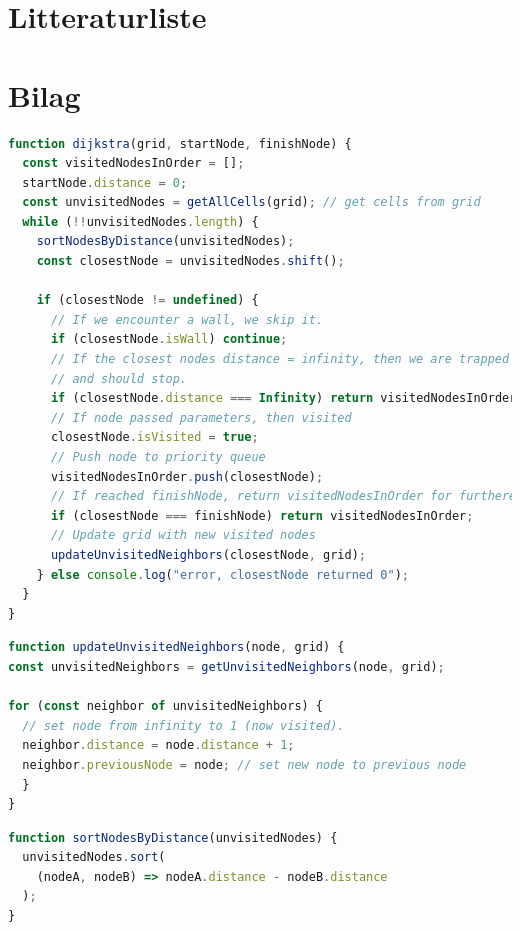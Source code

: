 \documentclass[12pt]{article}
\begin{document}
\section{Litteraturliste}

\newpage
\section{Bilag}

\begin{lstlisting}[language=JavaScript, caption=Kode for Dijkstra's Algoritme, label={lst:Dijkstra}]
function dijkstra(grid, startNode, finishNode) {
  const visitedNodesInOrder = [];
  startNode.distance = 0;
  const unvisitedNodes = getAllCells(grid); // get cells from grid
  while (!!unvisitedNodes.length) {
    sortNodesByDistance(unvisitedNodes);
    const closestNode = unvisitedNodes.shift();

    if (closestNode != undefined) {
      // If we encounter a wall, we skip it.
      if (closestNode.isWall) continue;
      // If the closest nodes distance = infinity, then we are trapped 
      // and should stop.
      if (closestNode.distance === Infinity) return visitedNodesInOrder;
      // If node passed parameters, then visited
      closestNode.isVisited = true; 
      // Push node to priority queue
      visitedNodesInOrder.push(closestNode);
      // If reached finishNode, return visitedNodesInOrder for furthere use.
      if (closestNode === finishNode) return visitedNodesInOrder;
      // Update grid with new visited nodes
      updateUnvisitedNeighbors(closestNode, grid); 
    } else console.log("error, closestNode returned 0");
  }
}
\end{lstlisting}
\begin{lstlisting}[language=JavaScript, caption=Kode for opdatering af unvisitedNodes]
function updateUnvisitedNeighbors(node, grid) {
const unvisitedNeighbors = getUnvisitedNeighbors(node, grid);

for (const neighbor of unvisitedNeighbors) {
  // set node from infinity to 1 (now visited).
  neighbor.distance = node.distance + 1;
  neighbor.previousNode = node; // set new node to previous node
  }
}
\end{lstlisting}
\begin{lstlisting}[language=JavaScript, caption=Kode for finde tætteste nodes]
  function sortNodesByDistance(unvisitedNodes) {
  unvisitedNodes.sort(
    (nodeA, nodeB) => nodeA.distance - nodeB.distance
  );
}
\end{lstlisting}
\end{document}
